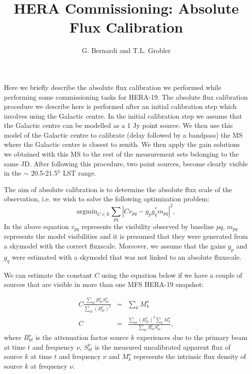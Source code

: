 \documentclass[a4paper,10pt]{article}
\title{HERA Commissioning: Absolute Flux Calibration}
\author{G. Bernardi and T.L. Grobler}
\begin{document}
\maketitle

Here we briefly describe the absolute flux calibration we performed while performing some commissioning tasks for HERA-19.
The absolute flux calibration procedure we describe here is performed after an initial calibration step which involves using the Galactic centre. In the 
initial calibration step we assume that the Galactic centre can be modelled as a 1 Jy point source. We then use this model of the Galactic centre to calibrate (delay followed by a bandpass) the MS where the Galactic centre 
is closest to zenith. We then apply the gain solutions we obtained with this MS to the rest of the measurement sets belonging to the same JD. After following this procedure, two point sources,
become clearly visible in the $\sim$ 20.5-21.5$^h$ LST range.

The aim of absolute calibration is to determine the absolute flux scale of the observation, i.e. we wish to solve the following optimization 
problem:
\begin{equation}
\textrm{argmin}_{C\in\mathbb{R}} \sum_{pq} |C v_{pq} -  g_{p}g_{q}^*m_{pq}|^2, 
\end{equation}
In the above equation $v_{pq}$ represents the visibility observed by baseline $pq$, $m_{pq}$ represents the model 
visibilities and it is presumed that they were generated from a skymodel with the correct fluxscale. Moreover, we assume that the gains 
$g_p$ and $g_q$ were estimated with a skymodel that was not linked to an absolute fluxscale.

We can estimate the constant $C$ using the equation below if we have a couple 
of sources that are visible in more than one MFS HERA-19 snapshot:  

\begin{eqnarray}
C\frac{\sum_{kt}B_{kt}^{\nu}S_{kt}^{\nu}}{\sum_{kt}(B_{kt}^{\nu})^2} &=& \sum_k{M_{k}^{\nu}}\\
C &=& \frac{\sum_{kt}(B_{kt}^{\nu})^2\sum_k{M_{k}^{\nu}}}{\sum_{kt}B_{kt}^{\nu}S_{kt}^{\nu}},\label{eq:c}
\end{eqnarray}
where $B_{kt}^{\nu}$ is the attenuation factor source $k$ experiences due to the primary beam at time $t$ and frequency $\nu$,
$S_{kt}^{\nu}$ is the measured uncalibrated apparent flux of source $k$ at time $t$ and frequency $\nu$ and $M_{k}^{\nu}$ represents the 
intrinsic flux density of source $k$ at frequency $\nu$. 
\end{document}
